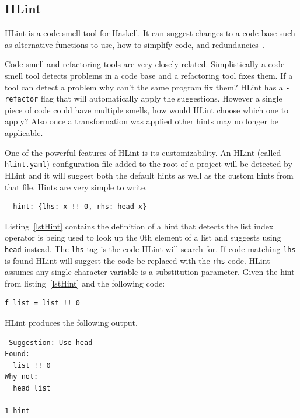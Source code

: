 \subsection{HLint}

HLint is a code smell tool for Haskell. It can suggest changes to a code base such as alternative functions to use, how to simplify code, and redundancies~\citep{hlint}.

Code smell and refactoring tools are very closely related. Simplistically a code smell tool detects problems in a code base and a refactoring tool fixes them. If a tool can detect a problem why can't the same program fix them? HLint has a \texttt{-refactor} flag that will automatically apply the suggestions. However a single piece of code could have multiple smells, how would HLint choose which one to apply? Also once a transformation was applied other hints may no longer be applicable.

One of the powerful features of HLint is its customizability. An HLint (called \texttt{hlint.yaml}) configuration file added to the root of a project   will be detected by HLint and it will suggest both the default hints as well as the custom hints from that file. Hints are very simple to write.

\begin{lstlisting}[caption={A simple hint from~\citep{hlint}}, label=lstHint]
- hint: {lhs: x !! 0, rhs: head x}
\end{lstlisting}

Listing~\ref{lstHint} contains the definition of a hint that detects the list index operator is being used to look up the 0th element of a list and suggests using \texttt{head} instead. The \texttt{lhs} tag is the code HLint will search for. If code matching \texttt{lhs} is found  HLint will suggest the code be replaced with the \texttt{rhs} code. HLint assumes any single character variable is a substitution parameter. Given the hint from listing~\ref{lstHint} and the following code:

\begin{lstlisting}
f list = list !! 0
\end{lstlisting}

HLint produces the following output.

\begin{lstlisting}
 Suggestion: Use head
Found:
  list !! 0
Why not:
  head list

1 hint
\end{lstlisting}


